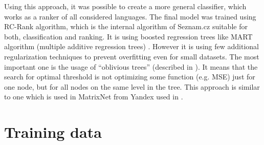 \documentclass{acm_proc_article-sp}
\begin{document}
  Using this approach, it was possible to create a more general classifier, which works as a ranker of all considered languages.
  The final model was trained using RC-Rank algorithm, which is the internal algorithm of Seznam.cz suitable for both, classification and ranking.
  It is using boosted regression trees like MART algorithm (multiple additive regression trees) \cite{friedman:mart}. 
  However it is using few additional regularization techniques to prevent overfitting even for small datasets.
  The most important one is the usage of “oblivious trees” (described in \cite{langley:oblivious}). 
  It means that the search for optimal threshold is not optimizing some function (e.g. MSE) just for one node, 
  but for all nodes on the same level in the tree. 
  This approach is similar to one which is used in MatrixNet from Yandex used in \cite{trofimov:matrixnet}.



  \section{Training data}
\end{document}
